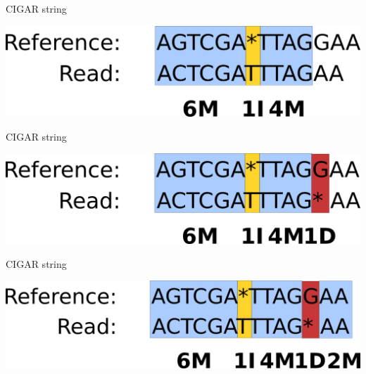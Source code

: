 \documentclass{beamer}
\begin{document}
\begin{frame}{CIGAR string}
  \begin{center}
    \includegraphics[width=\linewidth, keepaspectratio]{pic/c4.png}
  \end{center}
\end{frame}

\begin{frame}{CIGAR string}
  \begin{center}
    \includegraphics[width=\linewidth, keepaspectratio]{pic/c5.png}
  \end{center}
\end{frame}

\begin{frame}{CIGAR string}
  \begin{center}
    \includegraphics[width=\linewidth, keepaspectratio]{pic/c6.png}
  \end{center}
\end{frame}
\end{document}
